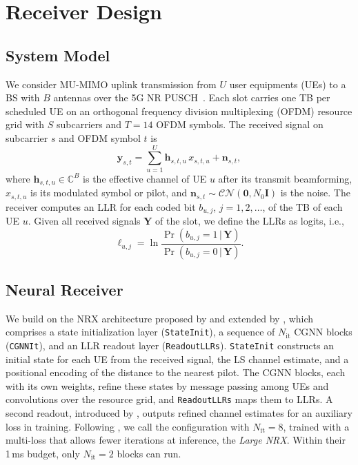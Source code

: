 \section{Receiver Design}

\subsection{System Model}
We consider MU-MIMO uplink transmission from $U$ user equipments (UEs) to a BS with $B$ antennas over the 5G NR PUSCH~\cite{dahlman2020}. Each slot carries one TB per scheduled UE on an orthogonal frequency division multiplexing (OFDM) resource grid with $S$ subcarriers and $T=14$ OFDM symbols. The received signal on subcarrier $s$ and OFDM symbol $t$ is
\begin{equation}
\mathbf{y}_{s,t}=\sum_{u=1}^{U}\mathbf{h}_{s,t,u}\,x_{s,t,u}+\mathbf{n}_{s,t},
\end{equation}
where $\mathbf{h}_{s,t,u}\in\mathbb{C}^{B}$ is the effective channel of UE $u$ after its transmit beamforming, $x_{s,t,u}$ is its modulated symbol or pilot, and $\mathbf{n}_{s,t}\sim\mathcal{CN}(\mathbf{0},N_0\mathbf{I})$ is the noise. The receiver computes an LLR for each coded bit $b_{u,j}$, $j=1,2,\dots$, of the TB of each UE $u$. Given all received signals $\mathbf{Y}$ of the slot, we define the LLRs as logits, i.e.,
\begin{equation}
\ell_{u,j}=\ln\frac{\Pr(b_{u,j}=1\,|\,\mathbf{Y})}{\Pr(b_{u,j}=0\,|\,\mathbf{Y})}.
\end{equation}

\subsection{Neural Receiver}

We build on the NRX architecture proposed by \citet{cammerer2023neural} and extended by \citet{wiesmayr2025realtime}, which comprises a state initialization layer (\texttt{StateInit}), a sequence of $N_{\mathrm{it}}$ CGNN blocks (\texttt{CGNNIt}), and an LLR readout layer (\texttt{ReadoutLLRs}). \texttt{StateInit} constructs an initial state for each UE from the received signal, the LS channel estimate, and a positional encoding of the distance to the nearest pilot. The CGNN blocks, each with its own weights, refine these states by message passing among UEs and convolutions over the resource grid, and \texttt{ReadoutLLRs} maps them to LLRs. A second readout, introduced by \citet{wiesmayr2025realtime}, outputs refined channel estimates for an auxiliary loss in training. Following \citet{wiesmayr2025realtime}, we call the configuration with $N_{\mathrm{it}}=8$, trained with a multi-loss that allows fewer iterations at inference, the \emph{Large NRX}. Within their 1\,ms budget, only $N_{\mathrm{it}}=2$ blocks can run.

